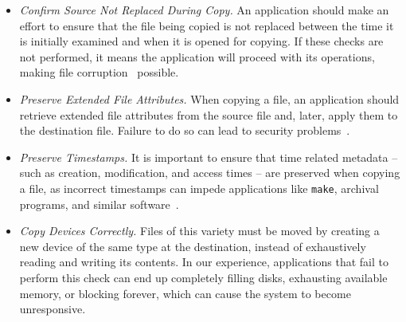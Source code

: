 \begin{itemize}
    \item{{\it Confirm Source Not Replaced During Copy.} An application
        should make an effort to ensure that the file being copied is not replaced between the time it is initially examined and when it is opened for copying.
If these checks are not performed, it
means the application will proceed with its operations,
        making file corruption~\cite{PythonShutilBug}} possible.

    \item{{\it Preserve Extended File Attributes.}
When copying a file,
an application should retrieve extended file attributes from the source
file and, later, apply them to the destination file.  Failure to do so can lead to security problems~\cite{AppleCodeSigning}.}

    \item{{\it Preserve Timestamps.}  It is important to ensure
that time related metadata --
such as creation, modification, and access times  --
are preserved when copying a file, as
incorrect timestamps can impede applications like {\tt make},
        archival programs, and similar software~\cite{NautilusTimestamps,
        SudoTimestamp}.}

    \item{{\it Copy Devices Correctly.}
Files of this variety must be moved
by creating a new device of the same type at the destination,
instead of exhaustively reading and writing its contents.
In our experience, applications that fail to perform this check
can end up completely filling disks, exhausting available memory,
        or blocking forever, which can cause the system to become unresponsive.}

\end{itemize}

